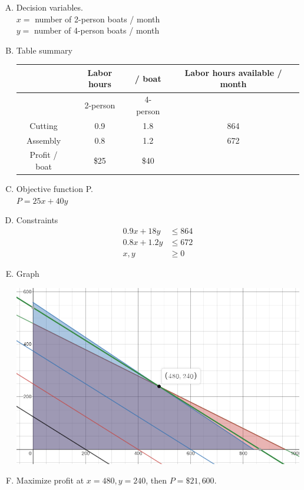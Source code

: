 \documentclass[14pt]{extarticle}
\begin{document}
\begin{enumerate}
\begin{enumerate}[A)]
	\item Decision variables.\\
	$x=$ number of 2-person boats / month \\
	$y=$ number of 4-person boats / month
	\item Table summary \\
	\begin{tabular}{|c|c|c|c|}
		\hline
		& Labor hours & / boat & Labor hours available / month \\
		\hline
		& 2-person & 4-person &  \\
		\hline \hline
		Cutting & 0.9 & 1.8 & 864 \\
		\hline
		Assembly & 0.8 & 1.2 & 672 \\
		\hline \hline
		Profit / boat & \$25 & \$40 &  \\
		\hline
	\end{tabular}
	\item Objective function P. \\
	$P = 25x + 40y$
	\item Constraints
	\begin{align*}
		0.9x + 18y &\leq 864 \\
		0.8x + 1.2y &\leq 672 \\
		x,y &\geq 0
	\end{align*}
	\item Graph
	\begin{center}
		\includegraphics[width=0.9\linewidth]{5-3-p1}
	\end{center}
	\item Maximize profit at $x=480, y=240$, then $P=\$21,600$.
\end{enumerate}

\cleardoublepage


\end{enumerate}
\end{document}

